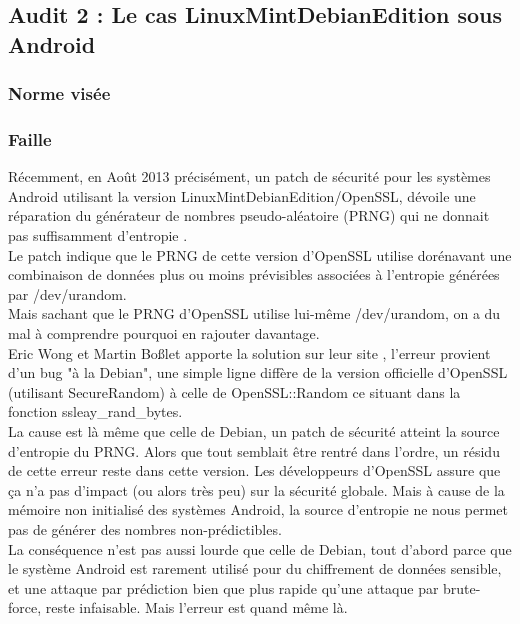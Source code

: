 	\subsection{Audit 2 : Le cas LinuxMintDebianEdition sous Android}
	\subsubsection{Norme visée}
	\subsubsection{Faille}
	
		Récemment, en Août 2013 précisément, un patch de sécurité pour les 
		systèmes Android utilisant la version LinuxMintDebianEdition/OpenSSL, 
		dévoile une réparation du générateur de nombres pseudo-aléatoire (PRNG) 
		qui ne donnait pas suffisamment d'entropie
		\cite{alex2013android} \cite{bochum2013randomly}. \\
		
		Le patch indique que le PRNG de cette version d'OpenSSL utilise dorénavant 
		une combinaison de données plus ou moins prévisibles associées à 
		l'entropie générées par /dev/urandom. \\
		Mais sachant que le PRNG d'OpenSSL utilise lui-même /dev/urandom, on a du 
		mal à comprendre pourquoi en rajouter davantage.\\
	
		Eric Wong et Martin Boßlet apporte la solution sur leur site
		\cite{boblet2013android}, l'erreur 
		provient d'un bug "à la Debian", une simple ligne diffère de la version 
		officielle d'OpenSSL (utilisant SecureRandom) à celle de OpenSSL::Random 
		ce situant dans la fonction ssleay\_rand\_bytes. \\
	
		La cause est là même que celle de Debian, un patch de sécurité atteint la 
		source d'entropie du PRNG. Alors que tout semblait être rentré dans 
		l'ordre, un résidu de cette erreur reste dans cette version. Les 
		développeurs d'OpenSSL assure que ça n'a pas d'impact (ou alors très peu) 
		sur la sécurité globale. 
		Mais à cause de la mémoire non initialisé des systèmes Android, la source 
		d'entropie ne nous permet pas de générer des nombres non-prédictibles. \\
	
		La conséquence n'est pas aussi lourde que celle de Debian, tout d'abord 
		parce que le système Android est rarement utilisé pour du 
		chiffrement de données sensible, et une attaque par prédiction bien que
		plus rapide qu'une attaque par brute-force, reste infaisable. 
		Mais l'erreur est quand même là. \\

